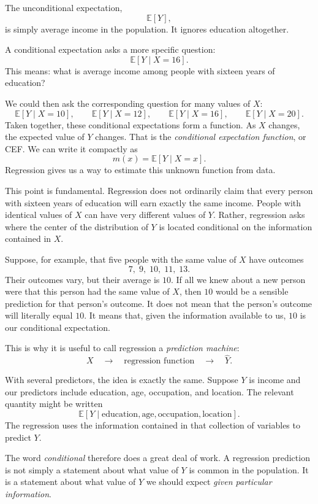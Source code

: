 \documentclass[11pt]{report}
\newcommand{\E}{\mathbb{E}}
\begin{document}
The unconditional expectation,
\[
\E[Y],
\]
is simply average income in the population. It ignores education altogether.

A conditional expectation asks a more specific question:
\[
\E[Y\mid X=16].
\]
This means: what is average income among people with sixteen years of education?

We could then ask the corresponding question for many values of \(X\):
\[
\E[Y\mid X=10], \qquad
\E[Y\mid X=12], \qquad
\E[Y\mid X=16], \qquad
\E[Y\mid X=20].
\]
Taken together, these conditional expectations form a function. As \(X\) changes, the expected value of \(Y\) changes. That is the \emph{conditional expectation function}, or CEF. We can write it compactly as
\[
m(x)=\E[Y\mid X=x].
\]
Regression gives us a way to estimate this unknown function from data.

This point is fundamental. Regression does not ordinarily claim that every person with sixteen years of education will earn exactly the same income. People with identical values of \(X\) can have very different values of \(Y\). Rather, regression asks where the center of the distribution of \(Y\) is located conditional on the information contained in \(X\).

Suppose, for example, that five people with the same value of \(X\) have outcomes
\[
7,\;9,\;10,\;11,\;13.
\]
Their outcomes vary, but their average is \(10\). If all we knew about a new person were that this person had the same value of \(X\), then \(10\) would be a sensible prediction for that person's outcome. It does not mean that the person's outcome will literally equal \(10\). It means that, given the information available to us, \(10\) is our conditional expectation.

This is why it is useful to call regression a \emph{prediction machine}:
\[
X
\quad\longrightarrow\quad
\text{regression function}
\quad\longrightarrow\quad
\widehat{Y}.
\]

With several predictors, the idea is exactly the same. Suppose \(Y\) is income and our predictors include education, age, occupation, and location. The relevant quantity might be written
\[
\E[Y \mid
\text{education},
\text{age},
\text{occupation},
\text{location}].
\]
The regression uses the information contained in that collection of variables to predict \(Y\).

The word \emph{conditional} therefore does a great deal of work. A regression prediction is not simply a statement about what value of \(Y\) is common in the population. It is a statement about what value of \(Y\) we should expect \emph{given particular information}.
\end{document}
